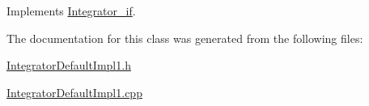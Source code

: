 Implements \hyperlink{class_integrator__if_a49c27818a4b0caf41c39d22a18b41337}{Integrator\+\_\+if}.



The documentation for this class was generated from the following files\+:\begin{DoxyCompactItemize}
\item 
\hyperlink{_integrator_default_impl1_8h}{Integrator\+Default\+Impl1.\+h}\item 
\hyperlink{_integrator_default_impl1_8cpp}{Integrator\+Default\+Impl1.\+cpp}\end{DoxyCompactItemize}
